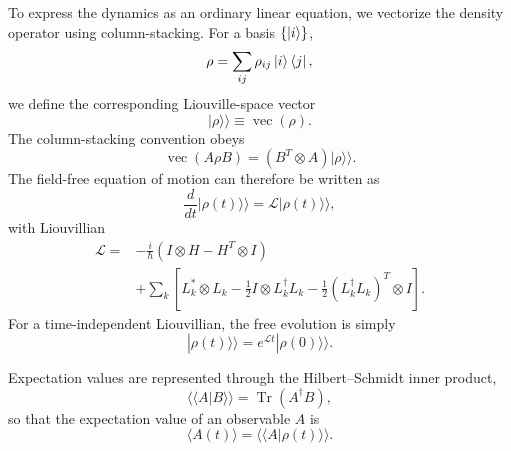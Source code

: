 To express the dynamics as an ordinary linear equation, we vectorize
the density operator using column-stacking. For a basis
$\{\ket{i}\}$,
%
\begin{equation}
\rho
=
\sum_{ij}
\rho_{ij}
\ket{i}\bra{j},
\end{equation}
%
we define the corresponding Liouville-space vector
%
\begin{equation}
|\rho\rangle\rangle
\equiv
\operatorname{vec}(\rho).
\label{eq:vectorization}
\end{equation}
%
The column-stacking convention obeys
%
\begin{equation}
\operatorname{vec}(A\rho B)
=
\left(
B^{T}\otimes A
\right)
|\rho\rangle\rangle .
\label{eq:vec_identity}
\end{equation}
%
The field-free equation of motion can therefore be written as
%
\begin{equation}
\frac{d}{dt}
|\rho(t)\rangle\rangle
=
\mathcal{L}
|\rho(t)\rangle\rangle ,
\label{eq:liouville_eom}
\end{equation}
%
with Liouvillian
%
\begin{align}
\mathcal{L}
={}&
-\frac{i}{\hbar}
\left(
I\otimes H
-
H^{T}\otimes I
\right)
\nonumber\\
&+
\sum_k
\left[
L_k^{*}\otimes L_k
-\frac{1}{2}
I\otimes L_k^\dagger L_k
-\frac{1}{2}
\left(
L_k^\dagger L_k
\right)^{T}\otimes I
\right].
\label{eq:liouvillian}
\end{align}
%
For a time-independent Liouvillian, the free evolution is simply
%
\begin{equation}
|\rho(t)\rangle\rangle
=
e^{\mathcal{L}t}
|\rho(0)\rangle\rangle .
\label{eq:free_liouville_propagation}
\end{equation}

Expectation values are represented through the Hilbert--Schmidt inner
product,
%
\begin{equation}
\langle\langle A|B\rangle\rangle
=
\operatorname{Tr}
\left(
A^\dagger B
\right),
\label{eq:hilbert_schmidt}
\end{equation}
%
so that the expectation value of an observable $A$ is
%
\begin{equation}
\langle A(t)\rangle
=
\langle\langle A|\rho(t)\rangle\rangle .
\label{eq:observable_liouville}
\end{equation}

